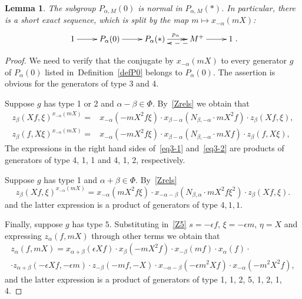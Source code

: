 \documentclass[oneside, 8pt]{amsart}
\newtheorem{lemma}{Lemma}
\theoremstyle{remark}
\theoremstyle{definition}
\numberwithin{lemma}{section}
\numberwithin{prop}{section}
\numberwithin{corollary}{section}
\numberwithin{equation}{section}
\begin{document}
\begin{lemma}\label{P0_normal} The subgroup $P_{\alpha, M}(0)$ is normal in $P_{\alpha, M}(*)$. In particular, there is a short exact sequence, which is split by the map $m \mapsto x_{-\alpha}(mX)$:
\[\xymatrix{1 \ar[r] & P_\alpha(0) \ar[r] & P_\alpha(*) \ar@{->>}[r]^{p_\alpha} & M^+ \ar@<5pt>@{-->}[l] \ar[r] & 1}.\] \end{lemma}
\begin{proof} We need to verify that the conjugate by $x_{-\alpha}(mX)$ to every generator $g$ of $P_\alpha(0)$ listed in~Definition~\ref{defP0} belongs to $P_\alpha(0)$.
The assertion is obvious for the generators of type 3 and 4.

Suppose $g$ has type 1 or 2 and $\alpha - \beta \in \Phi$. By~\cref{Zrels} we obtain that
\begin{align} z_{\beta}(Xf, \xi) ^ {x_{-\alpha}(mX)} = & x_{-\alpha} (- mX^2f\xi) \cdot x_{\beta-\alpha} (N_{\beta, -\alpha}\cdot mX^2f) \cdot z_{\beta}(Xf, \xi), \label{eq3-1} \\
  z_{\beta}(f, X\xi) ^ {x_{-\alpha}(mX)} = & x_{-\alpha} (- mX^2f\xi ) \cdot x_{\beta-\alpha} (N_{\beta, -\alpha}\cdot mXf) \cdot z_{\beta}(f, X\xi), \label{eq3-2} \end{align}
The expressions in the right hand sides of~\eqref{eq3-1} and~\eqref{eq3-2} are products of generators of type 4, 1, 1 and 4, 1, 2, respectively.  

Suppose $g$ has type 1 and  $\alpha + \beta \in \Phi$. By~\cref{Zrels} 
\begin{equation} \label{eq3-3} z_{\beta}(Xf, \xi) ^ {x_{-\alpha}(mX)} = x_{-\alpha} (mX^2f\xi ) \cdot x_{-\alpha-\beta} (N_{\beta,\alpha}\cdot mX^2f\xi^2) \cdot z_{\beta}(Xf, \xi). \end{equation}
and the latter expression is a product of generators of type $4, 1, 1$.

Finally, suppose $g$ has type $5$.
Substituting in~\eqref{Z5} $s = -\epsilon f$, $\xi = -\epsilon m$, $\eta=X$ and expressing $z_\alpha(f, mX)$ through other terms we obtain that
\begin{multline} \label{eq:zalpha} z_\alpha(f, mX) = x_{\alpha+\beta}(\epsilon Xf) \cdot x_{\beta}(-mX^2 f) \cdot x_{-\beta}(mf) \cdot x_\alpha(f) \cdot \\ 
 \cdot z_{\alpha+\beta}(-\epsilon X f, -\epsilon m) \cdot z_{-\beta}(-mf, -X) \cdot x_{-\alpha-\beta}(-\epsilon m^2X f) \cdot x_{-\alpha}(-m^2X^2 f), \end{multline}
and the latter expression is a product of generators of type 1, 1, 2, 5, 1, 2, 1, 4. \end{proof}
\end{document}
